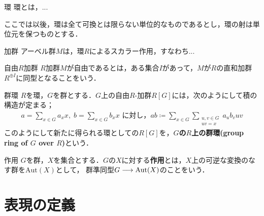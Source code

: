 \documentclass[a4paper,thmnumbering=section,eqnumbering=section]{summary-ja}
\begin{document}
\begin{definition}{環}{}
    環とは，...
\end{definition}

ここでは以後，環は全て可換とは限らない単位的なものであるとし，環の射は単位元を保つものとする．
\begin{definition}{加群}{}
    アーベル群$M$は，環$R$によるスカラー作用，すなわち...
\end{definition}

\begin{definition}{自由$R$加群}{}
    $R$加群$M$が自由であるとは，ある集合$I$があって，$M$が$R$の直和加群$R^{\oplus I}$に同型となることをいう．
\end{definition}

\begin{definition}{群環}{}
    $R$を環，$G$を群とする．$G$上の自由$R$-加群$R[G]$には，次のようにして積の構造が定まる；
    \begin{align}
        a = \sum_{x\in G}{}a_xx, \; b = \sum_{x\in G}{}b_xx \text{ に対し，}
        ab \coloneqq \sum_{x\in G}{}\sum_{\substack{u,v\in G \\ uv=x} }{}a_ub_vuv
    \end{align}
    このようにして新たに得られる環としての$R[G]$を，\textbf{$G$の$R$上の群環(group ring of $G$ over $R$)}という．
\end{definition}

\begin{definition}{作用}{}
    $G$を群，$X$を集合とする．$G$の$X$に対する\textbf{作用}とは，$X$上の可逆な変換のなす群を$\textrm{Aut}(X)$として，
    群準同型$G\longrightarrow \textrm{Aut}(X)$のことをいう．
\end{definition}



\newpage\section{表現の定義}%
\end{document}
